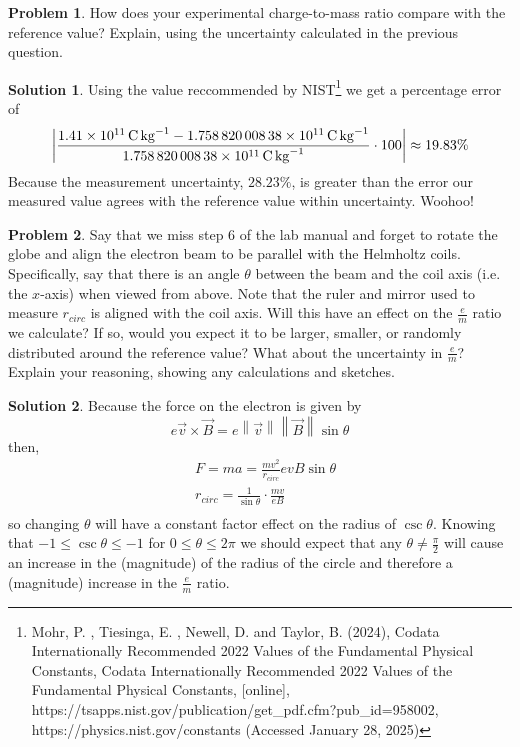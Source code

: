 \documentclass[10pt]{article}
\theoremstyle{definition}
\newtheorem{problem}{Problem}
\newtheorem{soln}{Solution}
\begin{document}
\begin{problem}
How does your experimental charge-to-mass ratio compare with the reference value? Explain, using the uncertainty calculated in the previous question.
\end{problem}
\begin{soln}
Using the value reccommended by NIST\footnote{Mohr, P. , Tiesinga, E. , Newell, D. and Taylor, B. (2024), Codata Internationally Recommended 2022 Values of the Fundamental Physical Constants, Codata Internationally Recommended 2022 Values of the Fundamental Physical Constants, [online], https://tsapps.nist.gov/publication/get\_pdf.cfm?pub\_id=958002, https://physics.nist.gov/constants (Accessed January 28, 2025) }
 we get a percentage error of 
 $$\left\lvert \frac{\qty{1.41d11}{\coulomb\per\kilo\gram}-\qty{1.758 820 008 38d11}{\coulomb\per\kilo\gram}}{\qty{1.758 820 008 38d11}{\coulomb\per\kilo\gram}}\cdot100\right\rvert\approx 19.83\%$$
Because the measurement uncertainty, $28.23\%$, is greater than the error our measured value agrees with the reference value within uncertainty. Woohoo!
\end{soln}

\begin{problem}
Say that we miss step 6 of the lab manual and forget to rotate the globe and align the electron beam to be parallel with the Helmholtz coils.
Specifically, say that there is an angle $\theta$ between the beam and the coil axis (i.e. the $x$-axis) when viewed from above.
Note that the ruler and mirror used to measure $r_{circ}$ is aligned with the coil axis. Will this have an effect on the $\frac{e}{m}$ ratio we calculate?
If so, would you expect it to be larger, smaller, or randomly distributed around the reference value? What about the uncertainty in $\frac{e}{m}$?
Explain your reasoning, showing any calculations and sketches.
\end{problem}
\begin{soln}
  Because the force on the electron is given by
  $$e\vec{v}\times \vec{B}=e\left\lVert \vec{v}\right\rVert\left\lVert \vec{B}\right\rVert\sin\theta$$
  then,
  \begin{align*}
     & F=ma=\frac{mv^2}{r_{circ}}evB\sin\theta         \\
     & r_{circ}=\frac{1}{\sin\theta}\cdot\frac{mv}{eB} \\
  \end{align*}
  so changing $\theta$ will have a constant factor effect on the radius of $\csc\theta$. Knowing that $-1\leq\csc\theta\leq-1$ for $0\leq\theta\leq2\pi$
  we should expect that any $\theta\neq\frac{\pi}{2}$ will cause an increase in the (magnitude) of the radius of the circle and therefore a (magnitude) increase in the $\frac{e}{m}$ ratio.
\end{soln}
\end{document}
